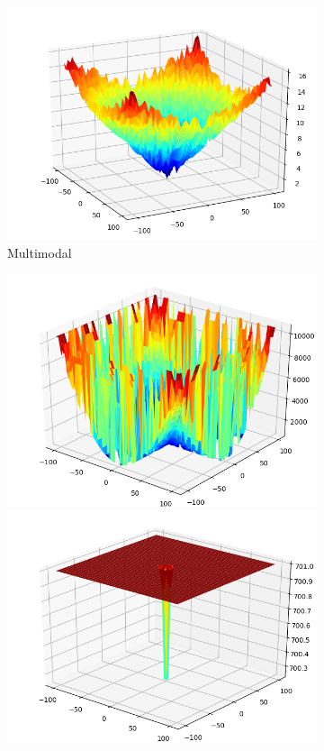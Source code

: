 \documentclass[a4paper,13pt,2p]{report}
\begin{document}
\begin{figure}[!ht]
\begin{subfigure}{0.24\textwidth}
  	 \includegraphics[width=1\linewidth]{png/functions/multi_f12}
  	 \caption{Multimodal}
  	\label{subfig:multi}
  	\end{subfigure}
   \begin{subfigure}{0.24\textwidth}
   	\includegraphics[width=1\linewidth]{png/functions/hybrid_f21}
  	 \includegraphics[width=1\linewidth]{png/functions/hybrid_f22}

\end{subfigure}
\end{figure}
\end{document}
